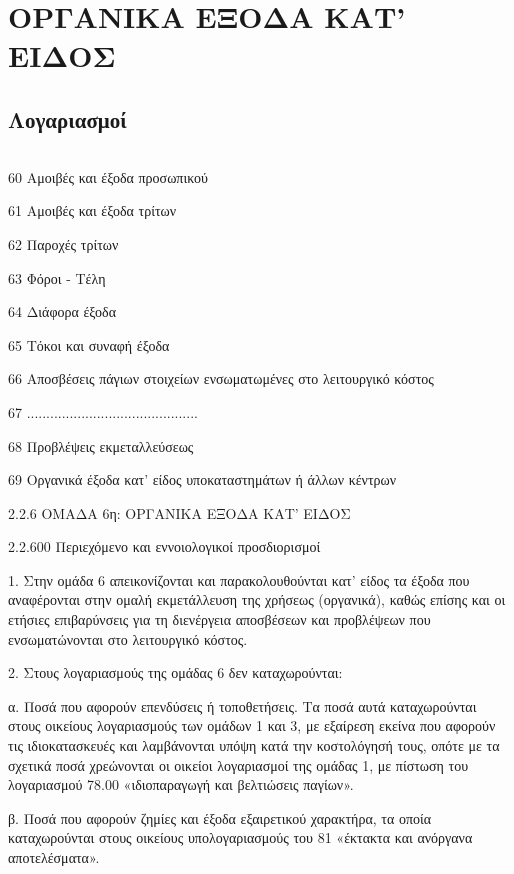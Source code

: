 \documentclass[A4,10pt,greek]{book}
\begin{document}
\chapter{ΟΡΓΑΝΙΚΑ ΕΞΟΔΑ ΚΑΤ' ΕΙΔΟΣ}

\section{Λογαριασμοί}

\begin{tabularx}{\linewidth}{lX}

\end{tabularx}

60 Αμοιβές και έξοδα προσωπικού

61 Αμοιβές και έξοδα τρίτων

62 Παροχές τρίτων

63 Φόροι - Τέλη

64 Διάφορα έξοδα

65 Τόκοι και συναφή έξοδα

66 Αποσβέσεις πάγιων στοιχείων ενσωματωμένες στο λειτουργικό κόστος

67 ............................................

68 Προβλέψεις εκμεταλλεύσεως

69 Οργανικά έξοδα κατ' είδος υποκαταστημάτων ή άλλων κέντρων

2.2.6 ΟΜΑΔΑ 6η: ΟΡΓΑΝΙΚΑ ΕΞΟΔΑ ΚΑΤ' ΕΙΔΟΣ

2.2.600 Περιεχόμενο και εννοιολογικοί προσδιορισμοί

1. Στην ομάδα 6 απεικονίζονται και παρακολουθούνται κατ' είδος τα έξοδα που αναφέρονται στην ομαλή εκμετάλλευση της χρήσεως (οργανικά), καθώς επίσης και οι ετήσιες επιβαρύνσεις για τη διενέργεια αποσβέσεων και προβλέψεων που ενσωματώνονται στο λειτουργικό κόστος.

2. Στους λογαριασμούς της ομάδας 6 δεν καταχωρούνται:

α. Ποσά που αφορούν επενδύσεις ή τοποθετήσεις. Τα ποσά αυτά καταχωρούνται στους οικείους λογαριασμούς των ομάδων 1 και 3, με εξαίρεση εκείνα που αφορούν τις ιδιοκατασκευές και λαμβάνονται υπόψη κατά την κοστολόγησή τους, οπότε με τα σχετικά ποσά χρεώνονται οι οικείοι λογαριασμοί της ομάδας 1, με πίστωση του λογαριασμού 78.00 «ιδιοπαραγωγή και βελτιώσεις παγίων».

β. Ποσά που αφορούν ζημίες και έξοδα εξαιρετικού χαρακτήρα, τα οποία καταχωρούνται στους οικείους υπολογαριασμούς του 81 «έκτακτα και ανόργανα αποτελέσματα».
\end{document}
